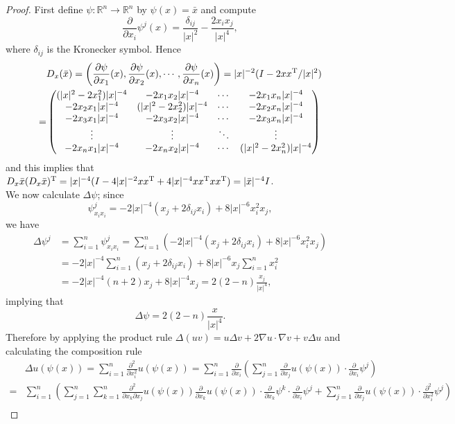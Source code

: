 \documentclass[hyperref,UTF8,12pt]{article}
\numberwithin{equation}{subsection}
\theoremstyle{plain}
\theoremstyle{definition}
\numberwithin{theorem}{section}
\numberwithin{lemma}{section}
\numberwithin{proposition}{section}
\numberwithin{remark}{section}
\numberwithin{corollary}{section}
\numberwithin{definition}{section}
\numberwithin{problem}{section}
\numberwithin{example}{section}
\def\T{\textup{T}}
\newcommand{\ptl}{\partial}
\newcommand{\mr}{\mathbb{R}}
\begin{document}
\begin{proof}
First define $\psi:\mr^n\to\mr^n$ by $\psi(x)=\bar{x}$ and compute \[\frac{\ptl}{\ptl x_i}\psi^j(x)=\frac{\delta_{ij}}{|x|^2}-\frac{2x_ix_j} {|x|^4},\]where $\delta_{ij}$ is the Kronecker symbol. Hence \[\begin{aligned}
	&D_x(\bar{x})=\left(\frac{\ptl\psi}{\ptl x_1}(x),\frac{\ptl\psi}{\ptl x_2}(x),\cdots,\frac{\ptl\psi}{\ptl x_n}(x)\right)=|x|^{-2}(I-2xx^\T/|x|^2)\\
	=&\begin{pmatrix}
		(|x|^2-2x_1^2)|x|^{-4}&-2x_1x_2|x|^{-4}&\cdots&-2x_1x_n|x|^{-4}\\
		-2x_2x_1|x|^{-4}&(|x|^2-2x_2^2)|x|^{-4}&\cdots&-2x_2x_n|x|^{-4}\\
		-2x_3x_1|x|^{-4}&-2x_3x_2|x|^{-4}&\cdots&-2x_3x_n|x|^{-4}\\
		\vdots & \vdots & \ddots & \vdots \\
		-2x_nx_1|x|^{-4}&-2x_nx_2|x|^{-4}&\cdots&(|x|^2-2x_n^2)|x|^{-4}
\end{pmatrix}\end{aligned}\]and this implies that $D_x\bar{x}(D_x\bar{x})^\T=|x|^
{-4}(I-4|x|^{-2}xx^\T+4|x|^{-4}xx^\T xx^\T)=|\bar{x}|^{-4}I$.\\
We now calculate $\Delta\psi$; since \[\psi_{x_ix_i}^j=-2|x|^{-4}(x_j+2\delta_{ij}x_i)+ 8|x|^{-6}x_i^2x_j,\]we have \[\begin{aligned}
	\Delta\psi^j&=\sum_{i=1}^n\psi_{x_ix_i}^j=\sum_{i=1}^n(-2|x|^{-4}(x_j+2\delta_{ij}x_i)+ 8|x|^{-6}x_i^2x_j)\\
	&=-2|x|^{-4}\sum_{i=1}^n(x_j+2\delta_{ij}x_i)+8|x|^{-6}x_j\sum_{i=1}^nx_i^2\\
	&=-2|x|^{-4}(n+2)x_j+8|x|^{-4}x_j=2(2-n)\frac{x_j}{|x|^4},
\end{aligned}\]implying that\[\Delta\psi=2(2-n)\frac{x}{|x|^4}.\] Therefore by applying the product rule $\Delta(uv)=u\Delta v+2\nabla u\cdot\nabla v+v\Delta u$ and calculating the composition rule\[\begin{aligned}
	&\Delta u(\psi(x))=\sum_{i=1}^n\frac{\ptl^2}{\ptl x_i^2}u(\psi(x))=\sum_{i=1} ^n\frac{\ptl}{\ptl x_i}\left(\sum_{j=1}^n\frac{\ptl}{\ptl x_j}u(\psi(x)) \cdot\frac{\ptl}{\ptl x_i}\psi^j\right)\\
	=&\sum_{i=1}^n\left(\sum_{j=1}^n \sum_{k=1}^n\frac{\ptl^2}{\ptl x_k \ptl x_j}u(\psi(x))\frac{\ptl}{\ptl x_k} u(\psi(x))\cdot\frac{\ptl}{\ptl x_k}\psi^k\cdot\frac{\ptl}{\ptl x_i}\psi^j+\sum_{j=1}^n\frac{\ptl}{\ptl x_j}u(\psi(x))\cdot\frac{\ptl^2}{\ptl x_i^2}\psi^j\right)\\

\end{aligned}\]
\end{proof}
\end{document}

